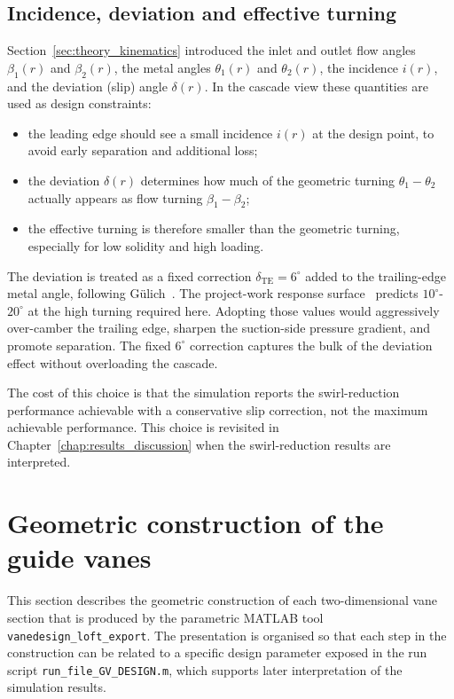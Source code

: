 \subsection{Incidence, deviation and effective turning}
\label{sec:theory_incidence_deviation}
 
Section~\ref{sec:theory_kinematics} introduced the inlet and outlet flow angles $\beta_1(r)$ and $\beta_2(r)$, the metal angles $\theta_1(r)$ and $\theta_2(r)$, the incidence $i(r)$, and the deviation (slip) angle $\delta(r)$. In the cascade view these quantities are used as design constraints:
\begin{itemize}
  \item the leading edge should see a small incidence $i(r)$ at the design point, to avoid early separation and additional loss;
  \item the deviation $\delta(r)$ determines how much of the geometric turning $\theta_1 - \theta_2$ actually appears as flow turning $\beta_1 - \beta_2$;
  \item the effective turning is therefore smaller than the geometric turning, especially for low solidity and high loading.
\end{itemize}
The deviation is treated as a fixed correction $\delta_{\mathrm{TE}} = 6^\circ$ added to the trailing-edge metal angle, following G\"ulich~\cite{Gulich2010}. The project-work response surface~\cite{Leonsen2025} predicts $10^\circ$-$20^\circ$ at the high turning required here. Adopting those values would aggressively over-camber the trailing edge, sharpen the suction-side pressure gradient, and promote separation. The fixed $6^\circ$ correction captures the bulk of the deviation effect without overloading the cascade.

The cost of this choice is that the simulation reports the swirl-reduction performance achievable with a conservative slip correction, not the maximum achievable performance. This choice is revisited in Chapter~\ref{chap:results_discussion} when the swirl-reduction results are interpreted.
 
\section{Geometric construction of the guide vanes}
\label{sec:theory_geometric_construction}
 
This section describes the geometric construction of each two-dimensional vane section that is produced by the parametric MATLAB tool \texttt{vanedesign\_loft\_export}. The presentation is organised so that each step in the construction can be related to a specific design parameter exposed in the run script \texttt{run\_file\_GV\_DESIGN.m}, which supports later interpretation of the simulation results.
 
